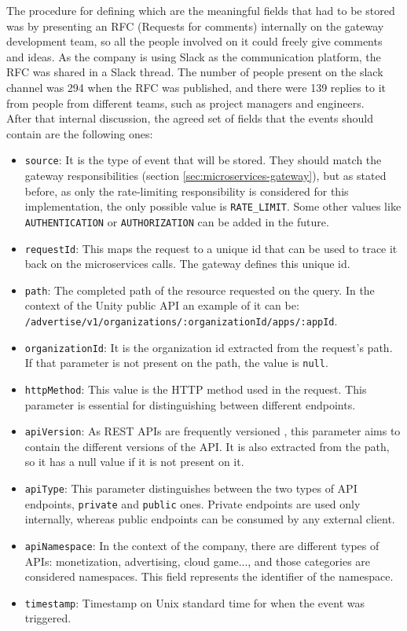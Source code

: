 \documentclass[english, 12pt, a4paper, sci, utf8, a-1b, online]{aaltothesis}
\begin{document}
The procedure for defining which are the meaningful fields that had to be stored was by presenting an RFC (Requests for comments) \cite{reynolds1987request} internally on the gateway development team, so all the people involved on it could freely give comments and ideas. As the company is using Slack as the communication platform, the RFC was shared in a Slack thread. The number of people present on the slack channel was 294 when the RFC was published, and there were 139 replies to it from people from different teams, such as project managers and engineers.\\

After that internal discussion, the agreed set of fields that the events should contain are the following ones:

\begin{itemize}
    \item \texttt{source}: It is the type of event that will be stored. They should match the gateway responsibilities (section \ref{sec:microservices-gateway}), but as stated before, as only the rate-limiting responsibility is considered for this implementation, the only possible value is \texttt{RATE\_LIMIT}. Some other values like \texttt{AUTHENTICATION} or \texttt{AUTHORIZATION} can be added in the future.
    \item \texttt{requestId}: This maps the request to a unique id that can be used to trace it back on the microservices calls. The gateway defines this unique id.
    \item \texttt{path}: The completed path of the resource requested on the query. In the context of the Unity public API an example of it can be: \\ \texttt{/advertise/v1/organizations/:organizationId/apps/:appId}.
    \item \texttt{organizationId}: It is the organization id extracted from the request's path. If that parameter is not present on the path, the value is \texttt{null}.
    \item \texttt{httpMethod}: This value is the HTTP method used in the request. This parameter is essential for distinguishing between different endpoints.
    \item \texttt{apiVersion}: As REST APIs are frequently versioned \cite{varga2016versioning}, this parameter aims to contain the different versions of the API. It is also extracted from the path, so it has a null value if it is not present on it.
    \item \texttt{apiType}: This parameter distinguishes between the two types of API endpoints, \texttt{private} and \texttt{public} ones. Private endpoints are used only internally, whereas public endpoints can be consumed by any external client.
    \item \texttt{apiNamespace}: In the context of the company, there are different types of APIs: monetization, advertising, cloud game..., and those categories are considered namespaces. This field represents the identifier of the namespace.
    \item \texttt{timestamp}: Timestamp on Unix standard time for when the event was triggered.
\end{itemize}
\end{document}
